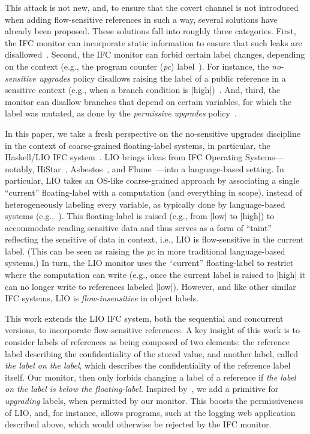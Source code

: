 This attack is not new, and, to ensure that the covert channel is
not introduced when adding flow-sensitive references in such a way,
several solutions have already been proposed. 
%
These solutions fall into roughly three categories.
%
First, the IFC monitor can incorporate static information to ensure that such
leaks are disallowed~\cite{Russo:2010,stefan:lio,Breeze}.
%
Second, the IFC monitor can forbid certain label changes, depending on the
context (e.g., the program counter (\emph{pc})
label~\cite{sabelfeld:language-based-iflow}).
%
For instance, the \emph{no-sensitive upgrades} policy disallows raising the
label of a public reference in a sensitive context (e.g., when a branch
condition is |high|)~\cite{Zdancewic02programminglanguages,
Austin:Flanagan:PLAS09}.
%
And, third, the monitor can disallow branches that depend on certain variables,
for which the label was mutated, as done by the \emph{permissive upgrades}
policy~\cite{Austin:Flanagan:PLAS10}.

In this paper, we take a fresh perspective on the no-sensitive upgrades
discipline in the context of coarse-grained floating-label systems, in
particular, the Haskell/LIO IFC system~\cite{stefan:lio,
stefan:addressing-covert}. 
%
LIO brings ideas from IFC Operating Systems---notably,
HiStar~\cite{zeldovich:histar}, Asbestos~\cite{Efstathopoulos:2005}, and
Flume~\cite{krohn:flume}---into a language-based setting.
%
In particular, LIO takes an OS-like coarse-grained approach by associating a
single ``current'' floating-label with a computation (and everything in scope),
instead of heterogeneously labeling every variable, as typically done by
language-based systems (e.g.,~\cite{jif,FlowCaml}).
%
This floating-label is raised (e.g., from |low| to |high|) to accommodate
reading sensitive data and thus serves as a form of ``taint'' reflecting the
sensitive of data in context, i.e., LIO is flow-sensitive in the current label.
%
(This can be seen as raising the \emph{pc} in more traditional language-based
systems.)
%
In turn, the LIO monitor uses the ``current'' floating-label to
restrict where the computation can write (e.g., once the current label
is raised to |high| it can no longer write to references labeled
|low|).
%
However, and like other similar IFC systems, LIO is \emph{flow-insensitive} in
object labels.

This work extends the LIO IFC system, both the sequential and concurrent
versions, to incorporate flow-sensitive references.
%
A key insight of this work is to consider labels of references as
being composed of two elements: the reference label describing the
confidentiality of the stored value, and another label, called
\emph{the label on the label}, which describes the confidentiality of
the reference label itself.
%
Our monitor, then only forbids changing a label of a reference if
\emph{the label on the label is below the floating-label}.
%
Inspired by~\cite{Hedin13}, we add a primitive for \emph{upgrading} labels,
when permitted by our monitor.
%
This boosts the permissiveness of LIO, and, for instance, allows programs, such
at the logging web application described above, which would otherwise be
rejected by the IFC monitor.

